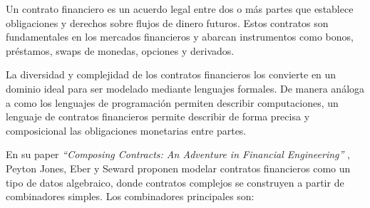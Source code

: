 \documentclass[a4paper, 12pt]{article}
\begin{document}
Un contrato financiero es un acuerdo legal entre dos o más partes que establece obligaciones y derechos sobre flujos de dinero futuros. Estos contratos son fundamentales en los mercados financieros y abarcan instrumentos como bonos, préstamos, swaps de monedas, opciones y derivados.

La diversidad y complejidad de los contratos financieros los convierte en un dominio ideal para ser modelado mediante lenguajes formales. De manera análoga a como los lenguajes de programación permiten describir computaciones, un lenguaje de contratos financieros permite describir de forma precisa y composicional las obligaciones monetarias entre partes.

En su paper \textit{``Composing Contracts: An Adventure in Financial Engineering''} \cite{peytonjones2000}, Peyton Jones, Eber y Seward proponen modelar contratos financieros como un tipo de datos algebraico, donde contratos complejos se construyen a partir de combinadores simples. Los combinadores principales son:
\end{document}

